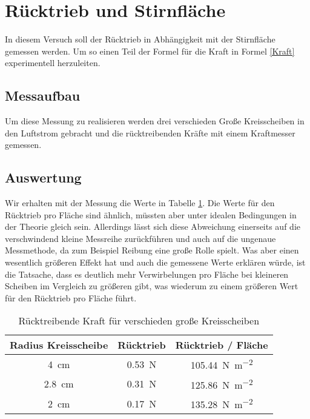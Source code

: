 \section{Rücktrieb und Stirnfläche}

In diesem Versuch soll der Rücktrieb in Abhängigkeit mit der Stirnfläche gemessen werden. Um so einen Teil der Formel für die Kraft in Formel \ref{Kraft} experimentell herzuleiten.

\subsection{Messaufbau}

Um diese Messung zu realisieren werden drei verschieden Große Kreisscheiben in den Luftstrom gebracht und die rücktreibenden Kräfte mit einem Kraftmesser gemessen.

\subsection{Auswertung}

Wir erhalten mit der Messung die Werte in Tabelle \ref{tab:Aufgabe2.1}. Die Werte für den Rücktrieb pro Fläche sind ähnlich, müssten aber unter idealen Bedingungen in der Theorie gleich sein. Allerdings lässt sich diese Abweichung einerseits auf die verschwindend kleine Messreihe zurückführen und auch auf die ungenaue Messmethode, da zum Beispiel Reibung eine große Rolle spielt. Was aber einen wesentlich größeren Effekt hat und auch die gemessene Werte erklären würde, ist die Tatsache, dass es deutlich mehr Verwirbelungen pro Fläche bei kleineren Scheiben im Vergleich zu größeren gibt, was wiederum zu einem größeren Wert für den Rücktrieb pro Fläche führt.

\begin{table}[h]
    \caption{Rücktreibende Kraft für verschieden große Kreisscheiben}
    \centering
    \begin{tabular}{c c c}
    \hline
    Radius Kreisscheibe     & Rücktrieb  & Rücktrieb / Fläche\\
    \hline
    \SI{4}{\centi\metre}     & \SI{0.53}{\newton} & \SI{105.44}{\newton\per\square\metre}\\[5pt]
    \SI{2.8}{\centi\metre}  &   \SI{0.31}{\newton} & \SI{125.86}{\newton\per\square\metre} \\[5pt]
    \SI{2}{\centi\metre}    &   \SI{0.17}{\newton} & \SI{135.28}{\newton\per\square\metre} \\[5pt]
    \hline
    \end{tabular}
    \label{tab:Aufgabe2.1}
\end{table}

